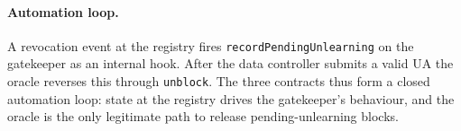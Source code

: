 \paragraph{Automation loop.} A revocation event at the registry fires
\texttt{recordPendingUnlearning} on the gatekeeper as an internal
hook. After the data controller submits a valid UA the oracle reverses
this through \texttt{unblock}. The three contracts thus form a closed
automation loop: state at the registry drives the gatekeeper's
behaviour, and the oracle is the only legitimate path to release
pending-unlearning blocks.
